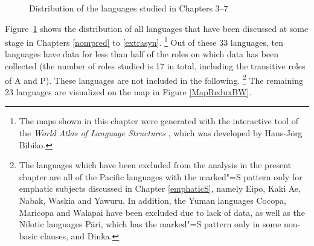 \begin{figure}[h,t,b] \centering {}
\caption{Distribution of the languages studied in Chapters 3--7}\label{MapFullBW}
\end{figure}

Figure~\ref{MapFullBW} shows the distribution of all languages that have been discussed at some stage in Chapters \ref{nompred} to \ref{extrasyn}.
\footnote{The maps shown in this chapter were generated with the interactive tool of the \textit{World Atlas of Language Structures} \citep{WALS}, which was developed by Hans-J\"org Bibiko.} 
Out of these 33 languages, ten languages have data for less than half of the  roles on which data has been collected (the number of roles studied is 17 in total, including the transitive roles of A and P). 
These languages are not included in the following.
\footnote{The languages which have been excluded from the analysis in the present chapter are all of the Pacific languages with the marked"=S pattern only for emphatic subjects discussed in Chapter \ref{emphaticS}, namely Eipo, Kaki Ae, Nabak, Waskia and Yawuru. In addition, the Yuman languages Cocopa, Maricopa and Walapai have been excluded due to lack of data, as well as the Nilotic languages P\"ari, which has the marked"=S pattern only in some non-basic clauses, and Dinka.} 
The remaining 23 languages are visualized on the map in Figure \ref{MapReduxBW}.

